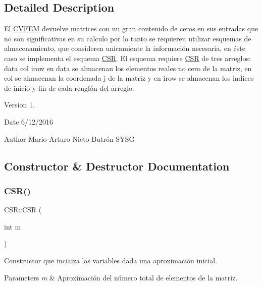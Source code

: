 \subsection{Detailed Description}
El \hyperlink{class_c_v_f_e_m}{C\+V\+F\+EM} devuelve matrices con un gran contenido de ceros en sus entradas que no son significativas en su calculo por lo tanto se requieren utilizar esquemas de almacenamiento, que consideren unicamiente la información necesaria, en éste caso se implementa el esquema \hyperlink{class_c_s_r}{C\+SR}. El esquema requiere \hyperlink{class_c_s_r}{C\+SR} de tres arreglos\+: data col irow en data se almacenan los elementos reales no cero de la matriz, en col se almacenan la coordenada j de la matriz y en irow se almacenan los indices de inicio y fin de cada renglón del arreglo. 

\begin{DoxyVersion}{Version}
1. 
\end{DoxyVersion}
\begin{DoxyDate}{Date}
6/12/2016 
\end{DoxyDate}
\begin{DoxyAuthor}{Author}
Mario Arturo Nieto Butrón  S\+Y\+SG 
\end{DoxyAuthor}


\subsection{Constructor \& Destructor Documentation}
\hypertarget{class_c_s_r_a0baa0913a803243656231d2f699285ff}{}\label{class_c_s_r_a0baa0913a803243656231d2f699285ff} 
\subsubsection{\texorpdfstring{C\+S\+R()}{CSR()}}
{\footnotesize\ttfamily C\+S\+R\+::\+C\+SR (\begin{DoxyParamCaption}\item[{int}]{m }\end{DoxyParamCaption})\hspace{0.3cm}{\ttfamily [inline]}}



Constructor que inciaiza las variables dada una aproximación inicial. 


\begin{DoxyParams}{Parameters}
{\em m} & Aproximación del número total de elementos de la matriz. \\
\hline
\end{DoxyParams}


